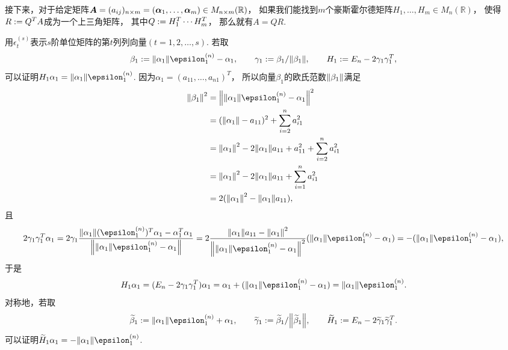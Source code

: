 接下来，对于给定矩阵\(\boldsymbol{A} = (a_{ij})_{n \times m} = (\boldsymbol\alpha_1,\dotsc,\boldsymbol\alpha_m) \in M_{n \times m}(\mathbb{R})\)，
如果我们能找到\(m\)个豪斯霍尔德矩阵\(H_1,\dotsc,H_m \in M_n(\mathbb{R})\)，
使得\(R := Q^T A\)成为一个上三角矩阵，
其中\(Q := H_1^T \dotsm H_m^T\)，
那么就有\(A = Q R\).

用\(\epsilon^{(s)}_t\)表示\(s\)阶单位矩阵的第\(t\)列列向量\((t=1,2,\dotsc,s)\).
若取\begin{equation*}
	\beta_1 \defeq \norm{\alpha_1} \epsilon^{(n)}_1 - \alpha_1,
	\qquad
	\gamma_1 \defeq \beta_1 / \norm{\beta_1},
	\qquad
	H_1 \defeq E_n - 2 \gamma_1 \gamma_1^T,
\end{equation*}
可以证明\(H_1 \alpha_1 = \norm{\alpha_1} \epsilon^{(n)}_1\).
因为\(\alpha_1 = (a_{11},\dotsc,a_{n1})^T\)，
所以向量\(\beta_1\)的欧氏范数\(\norm{\beta_1}\)满足\begin{align*}
	\norm{\beta_1}^2
	&= \norm{\norm{\alpha_1} \epsilon^{(n)}_1 - \alpha_1}^2 \\
	&= (\norm{\alpha_1} - a_{11})^2 + \sum_{i=2}^n a_{i1}^2 \\
	&= \norm{\alpha_1}^2 - 2 \norm{\alpha_1} a_{11} + a_{11}^2 + \sum_{i=2}^n a_{i1}^2 \\
	&= \norm{\alpha_1}^2 - 2 \norm{\alpha_1} a_{11} + \sum_{i=1}^n a_{i1}^2 \\
	&= 2 (\norm{\alpha_1}^2 - \norm{\alpha_1} a_{11}),
\end{align*}
且\begin{equation*}
	2 \gamma_1 \gamma_1^T \alpha_1
	= 2 \gamma_1
	\frac{
		\norm{\alpha_1} (\epsilon^{(n)}_1)^T \alpha_1 - \alpha_1^T \alpha_1
	}{
		\norm{
			\norm{\alpha_1} \epsilon^{(n)}_1 - \alpha_1
		}
	}
	= 2
	\frac{
		\norm{\alpha_1} a_{11} - \norm{\alpha_1}^2
	}{
		\norm{
			\norm{\alpha_1} \epsilon^{(n)}_1 - \alpha_1
		}^2
	}
	(\norm{\alpha_1} \epsilon^{(n)}_1 - \alpha_1)
	= - (\norm{\alpha_1} \epsilon^{(n)}_1 - \alpha_1),
\end{equation*}
于是\begin{equation*}
	H_1 \alpha_1
	= (E_n - 2 \gamma_1 \gamma_1^T) \alpha_1
	= \alpha_1 + (\norm{\alpha_1} \epsilon^{(n)}_1 - \alpha_1)
	= \norm{\alpha_1} \epsilon^{(n)}_1.
\end{equation*}
对称地，若取\begin{equation*}
	\widetilde{\beta}_1 \defeq \norm{\alpha_1} \epsilon^{(n)}_1 + \alpha_1,
	\qquad
	\widetilde{\gamma}_1 \defeq \widetilde{\beta}_1 / \norm{\widetilde{\beta}_1},
	\qquad
	\widetilde{H}_1 \defeq E_n - 2 \widetilde{\gamma}_1 \widetilde{\gamma}_1^T.
\end{equation*}
可以证明\(\widetilde{H}_1 \alpha_1 = - \norm{\alpha_1} \epsilon^{(n)}_1\).

